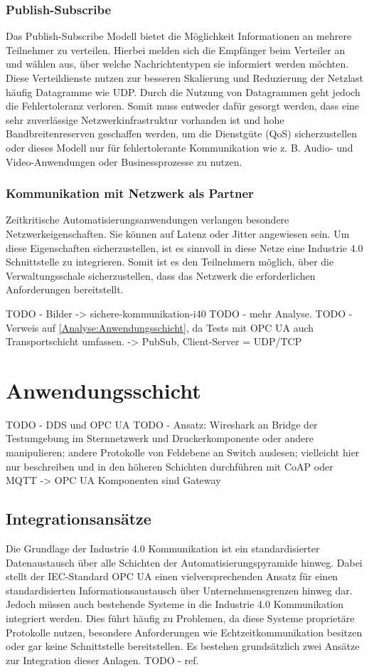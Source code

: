 \subsubsection{Publish-Subscribe}
Das Publish-Subscribe Modell bietet die Möglichkeit Informationen an mehrere Teilnehmer zu verteilen. Hierbei melden sich die Empfänger beim Verteiler an und wählen aus, über welche Nachrichtentypen sie informiert werden möchten. Diese Verteildienste nutzen zur besseren Skalierung und Reduzierung der Netzlast häufig Datagramme wie \ac{UDP}. Durch die Nutzung von Datagrammen geht jedoch die Fehlertoleranz verloren. Somit muss entweder dafür gesorgt werden, dass eine sehr zuverlässige Netzwerkinfrastruktur vorhanden ist und hohe Bandbreitenreserven geschaffen werden, um die Dienstgüte (\ac{QoS}) sicherzustellen oder dieses Modell nur für fehlertolerante Kommunikation wie z. B. Audio- und Video-Anwendungen oder Businessprozesse zu nutzen. 

\subsubsection{Kommunikation mit Netzwerk als Partner}
Zeitkritische Automatisierungsanwendungen verlangen besondere Netzwerkeigenschaften. Sie können auf Latenz oder Jitter angewiesen sein. Um diese Eigenschaften sicherzustellen, ist es sinnvoll in diese Netze eine Industrie 4.0 Schnittstelle zu integrieren. Somit ist es den Teilnehmern möglich, über die Verwaltungsschale sicherzustellen, dass das Netzwerk die erforderlichen Anforderungen bereitstellt. \cite{sichKom2017}

TODO - Bilder -> sichere-kommunikation-i40
TODO - mehr Analyse.
TODO - Verweis auf \autoref{Analyse:Anwendungsschicht}, da Tests mit OPC UA auch Transportschicht umfassen. -> PubSub, Client-Server = UDP/TCP

\section{Anwendungsschicht}
TODO - DDS und OPC UA
TODO - Ansatz: Wireshark an Bridge der Testumgebung im Sternnetzwerk und Druckerkomponente oder andere manipulieren; andere Protokolle von Feldebene an Switch auslesen; vielleicht hier nur beschreiben und in den höheren Schichten durchführen mit CoAP oder MQTT -> OPC UA Komponenten sind Gateway

\subsection{Integrationsansätze}
Die Grundlage der Industrie 4.0 Kommunikation ist ein standardisierter Datenaustausch über alle Schichten der Automatisierungspyramide hinweg. Dabei stellt der \ac{IEC}-Standard \ac{OPC UA} einen vielversprechenden Ansatz für einen standardisierten Informationsaustausch über Unternehmensgrenzen hinweg dar. Jedoch müssen auch bestehende Systeme in die Industrie 4.0 Kommunikation integriert werden. Dies führt häufig zu Problemen, da diese Systeme proprietäre Protokolle nutzen, besondere Anforderungen wie Echtzeitkommunikation besitzen oder gar keine Schnittstelle bereitstellen. Es bestehen grundsätzlich zwei Ansätze zur Integration dieser Anlagen. TODO - ref.

